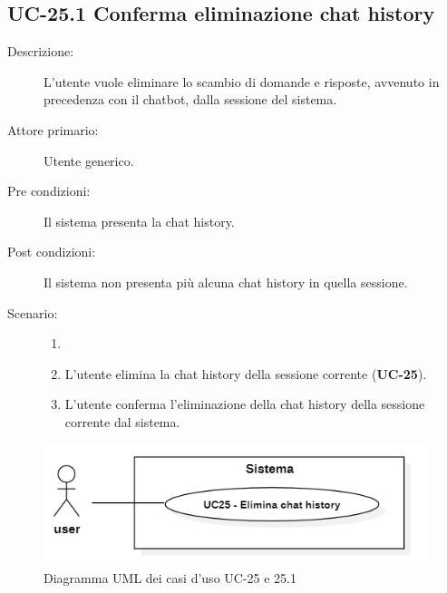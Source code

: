 \subsection{UC-25.1 Conferma eliminazione chat history}
\begin{description}
    \item[Descrizione:] L'utente vuole eliminare lo scambio di domande e risposte, avvenuto in precedenza con il chatbot, dalla sessione del sistema.
    \item[Attore primario:] Utente generico.
    \item[Pre condizioni:] Il sistema presenta la chat history.
    \item[Post condizioni:] Il sistema non presenta più alcuna chat history in quella sessione.
    \item[Scenario:]
    \begin{enumerate}
        \item[]
        \item L'utente elimina la chat history della sessione corrente (\textbf{UC-25}).
        \item L'utente conferma l'eliminazione della chat history della sessione corrente dal sistema.
    \end{enumerate}
\end{description}

\begin{figure}[H]
    \centering
    \includegraphics[width=0.9\linewidth]{UC25.png} %
    \caption{Diagramma UML dei casi d'uso UC-25 e 25.1}
    \label{fig:UC30-31}
\end{figure}

